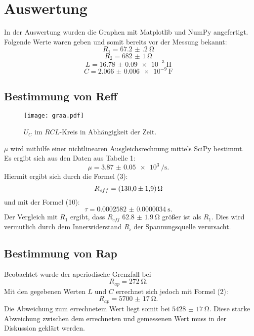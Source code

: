 \section{Auswertung}
\label{sec:Auswertung}
In der Auswertung wurden die Graphen mit Matplotlib \cite{matplotlib} und NumPy \cite{numpy} angefertigt.\\


Folgende Werte waren geben und somit bereits vor der Messung bekannt:
\begin{displaymath}
R_1 = \SI{67.2(2)}{\ohm}
\end{displaymath}
\begin{displaymath}
R_2 = \SI{682(1)}{\ohm}
\end{displaymath}
\begin{displaymath}
L = \SI{16.78(9)e-3}{\henry}
\end{displaymath}
\begin{displaymath}
C = \SI{2.066(6)e-9}{\farad}
\end{displaymath}

\subsection{Bestimmung von Reff}
\begin{figure}[H]
	\centering
	\caption{$U_C$ im $RCL$-Kreis in Abhängigkeit der Zeit.}
	\texttt{[image: graa.pdf]}
	\label{fig:graa}
\end{figure}

$\mu$ wird mithilfe einer nichtlinearen Ausgleichsrechnung mittels SciPy \cite{scipy} bestimmt. Es ergibt sich aus den Daten aus Tabelle 1:
\begin{displaymath}
\mu = \SI{3.87(5)e3}{\per\second}\text{.}
\end{displaymath}
Hiermit ergibt sich durch die Formel (3):
\begin{displaymath}
R_{eff} = \SI{130 \pm 1.9}{\ohm}
\end{displaymath}
und mit der Formel (10):
\begin{displaymath}
\tau = \SI{0.0002582(34)}{\second}\text{.}
\end{displaymath}
Der Vergleich mit $R_1$ ergibt, dass $R_{eff}$ $\SI{62.8(19)}{\ohm}$ größer ist als $R_1$. Dies wird vermutlich durch dem Innerwiderstand $R_i$ der Spannungsquelle verursacht.

\subsection{Bestimmung von Rap}
Beobachtet wurde der aperiodische Grenzfall bei
\begin{displaymath}
R_{ap} = \SI{272}{\ohm}\text{.}
\end{displaymath}
Mit den gegebenen Werten $L$ und $C$ errechnet sich jedoch mit Formel (2):
\begin{displaymath}
R_{ap} = \SI{5700(17)}{\ohm}\text{.}
\end{displaymath}
Die Abweichung zum errechnetem Wert liegt somit bei $\SI{5428(17)}{\ohm}$. 
Diese starke Abweichung zwischen dem errechneten und gemessenen Wert muss in der Diskussion geklärt werden.


